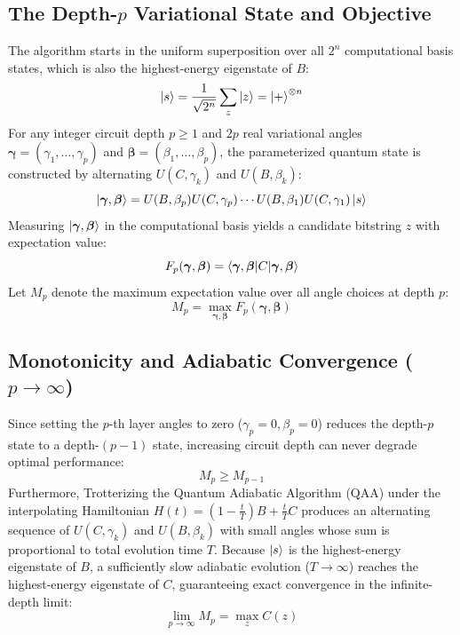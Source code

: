\documentclass[11pt,a4paper]{article}
\begin{document}
\subsection{The Depth-$p$ Variational State and Objective}
The algorithm starts in the uniform superposition over all $2^n$ computational basis states, which is also the highest-energy eigenstate of $B$:
\begin{equation}
    \ket{s} = \frac{1}{\sqrt{2^n}} \sum_{z} \ket{z} = \ket{+}^{\otimes n}
\end{equation}
For any integer circuit depth $p \ge 1$ and $2p$ real variational angles $\boldsymbol{\gamma} = (\gamma_1, \dots, \gamma_p)$ and $\boldsymbol{\beta} = (\beta_1, \dots, \beta_p)$, the parameterized quantum state is constructed by alternating $U(C, \gamma_k)$ and $U(B, \beta_k)$:
\begin{equation}
    \ket{\boldsymbol{\gamma}, \boldsymbol{\beta}} = U(B, \beta_p) U(C, \gamma_p) \cdots U(B, \beta_1) U(C, \gamma_1) \ket{s}
\end{equation}
Measuring $\ket{\boldsymbol{\gamma}, \boldsymbol{\beta}}$ in the computational basis yields a candidate bitstring $z$ with expectation value:
\begin{equation}
    F_p(\boldsymbol{\gamma}, \boldsymbol{\beta}) = \braket{\boldsymbol{\gamma}, \boldsymbol{\beta} | C | \boldsymbol{\gamma}, \boldsymbol{\beta}}
\end{equation}
Let $M_p$ denote the maximum expectation value over all angle choices at depth $p$:
\begin{equation}
    M_p = \max_{\boldsymbol{\gamma}, \boldsymbol{\beta}} F_p(\boldsymbol{\gamma}, \boldsymbol{\beta})
\end{equation}

\subsection{Monotonicity and Adiabatic Convergence ($p \to \infty$)}
Since setting the $p$-th layer angles to zero ($\gamma_p = 0, \beta_p = 0$) reduces the depth-$p$ state to a depth-$(p-1)$ state, increasing circuit depth can never degrade optimal performance:
\begin{equation}
    M_p \ge M_{p-1}
\end{equation}
Furthermore, Trotterizing the Quantum Adiabatic Algorithm (QAA) under the interpolating Hamiltonian $H(t) = \left(1 - \frac{t}{T}\right)B + \frac{t}{T}C$ produces an alternating sequence of $U(C, \gamma_k)$ and $U(B, \beta_k)$ with small angles whose sum is proportional to total evolution time $T$. Because $\ket{s}$ is the highest-energy eigenstate of $B$, a sufficiently slow adiabatic evolution ($T \to \infty$) reaches the highest-energy eigenstate of $C$, guaranteeing exact convergence in the infinite-depth limit:
\begin{equation}
    \lim_{p \to \infty} M_p = \max_{z} C(z)
\end{equation}
\end{document}
